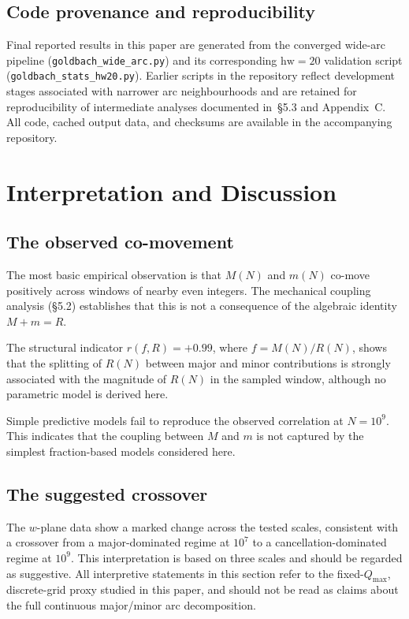 \documentclass[11pt,a4paper]{article}
\newcommand{\RN}{R(N)}
\newcommand{\MN}{M(N)}
\newcommand{\mN}{m(N)}
\newcommand{\Qmax}{Q_{\max}}
\begin{document}
\subsection{Code provenance and reproducibility}

Final reported results in this paper are generated from the converged wide-arc pipeline (\texttt{goldbach\_wide\_arc.py}) and its corresponding $\mathrm{hw} = 20$ validation script (\texttt{goldbach\_stats\_hw20.py}). Earlier scripts in the repository reflect development stages associated with narrower arc neighbourhoods and are retained for reproducibility of intermediate analyses documented in~\S5.3 and Appendix~C. All code, cached output data, and checksums are available in the accompanying repository.



\section{Interpretation and Discussion}

\subsection{The observed co-movement}

The most basic empirical observation is that $\MN$ and $\mN$ co-move positively across windows of nearby even integers. The mechanical coupling analysis (\S5.2) establishes that this is not a consequence of the algebraic identity $M + m = R$.

The structural indicator $r(f, R) = +0.99$, where $f = \MN/\RN$, shows that the splitting of $\RN$ between major and minor contributions is strongly associated with the magnitude of $\RN$ in the sampled window, although no parametric model is derived here.

Simple predictive models fail to reproduce the observed correlation at $N = 10^9$. This indicates that the coupling between $M$ and $m$ is not captured by the simplest fraction-based models considered here.


\subsection{The suggested crossover}

The $w$-plane data show a marked change across the tested scales, consistent with a crossover from a major-dominated regime at $10^7$ to a cancellation-dominated regime at $10^9$. This interpretation is based on three scales and should be regarded as suggestive. All interpretive statements in this section refer to the fixed-$\Qmax$, discrete-grid proxy studied in this paper, and should not be read as claims about the full continuous major/minor arc decomposition.
\end{document}
